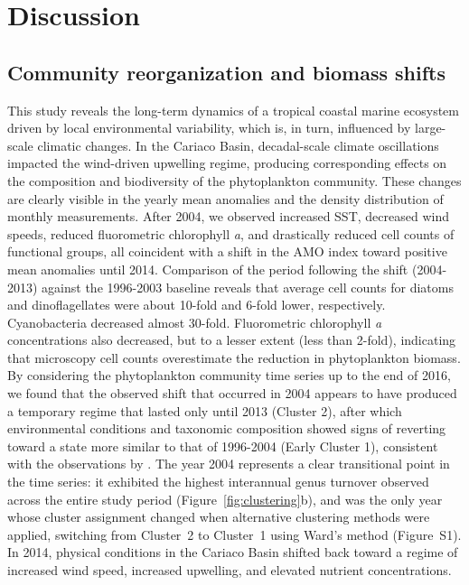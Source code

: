 \documentclass[]{agujournal2019}
\begin{document}
\section{Discussion}

\subsection{Community reorganization and biomass shifts}
    This study reveals the long-term dynamics of a tropical coastal marine ecosystem driven by local environmental variability, which is, in turn, influenced by large-scale climatic changes. In the Cariaco Basin, decadal-scale climate oscillations impacted the wind-driven upwelling regime, producing corresponding effects on the composition and biodiversity of the phytoplankton community.
    These changes are clearly visible in the yearly mean anomalies and the density distribution of monthly measurements. After 2004, we observed increased SST, decreased wind speeds, reduced fluorometric chlorophyll \textit{a}, and drastically reduced cell counts of functional groups, all coincident with a shift in the AMO index toward positive mean anomalies until 2014.  Comparison of the period following the shift (2004-2013) against the 1996-2003 baseline reveals that average cell counts for diatoms and dinoflagellates were about 10-fold and 6-fold lower, respectively. Cyanobacteria decreased almost 30-fold. Fluorometric chlorophyll \textit{a} concentrations also decreased, but to a lesser extent (less than 2-fold), indicating that microscopy cell counts overestimate the reduction in phytoplankton biomass.
    By considering the phytoplankton community time series up to the end of 2016, we found that the observed shift that occurred in 2004 appears to have produced a temporary regime that lasted only until 2013 (Cluster 2), after which environmental conditions and taxonomic composition showed signs of reverting toward a state more similar to that of 1996-2004 (Early Cluster 1), consistent with the observations by . The year 2004 represents a clear transitional point in the time series: it exhibited the highest interannual genus turnover observed across the entire study period (Figure~\ref{fig:clustering}b), and was the only year whose cluster assignment changed when alternative clustering methods were applied, switching from Cluster~2 to Cluster~1 using Ward's method (Figure~S1). In 2014, physical conditions in the Cariaco Basin shifted back toward a regime of increased wind speed, increased upwelling, and elevated nutrient concentrations.
\end{document}

